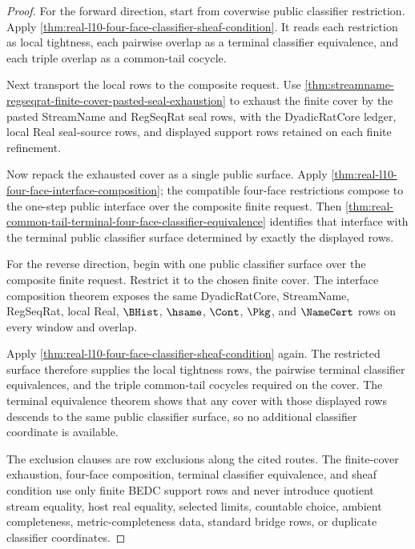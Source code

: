 \begin{proof}
For the forward direction, start from coverwise public classifier restriction. Apply \autoref{thm:real-l10-four-face-classifier-sheaf-condition}. It reads each restriction as local tightness, each pairwise overlap as a terminal classifier equivalence, and each triple overlap as a common-tail cocycle.

Next transport the local rows to the composite request. Use \autoref{thm:streamname-regseqrat-finite-cover-pasted-seal-exhaustion} to exhaust the finite cover by the pasted StreamName and RegSeqRat seal rows, with the DyadicRatCore ledger, local Real seal-source rows, and displayed support rows retained on each finite refinement.

Now repack the exhausted cover as a single public surface. Apply \autoref{thm:real-l10-four-face-interface-composition}; the compatible four-face restrictions compose to the one-step public interface over the composite finite request. Then \autoref{thm:real-common-tail-terminal-four-face-classifier-equivalence} identifies that interface with the terminal public classifier surface determined by exactly the displayed rows.

For the reverse direction, begin with one public classifier surface over the composite finite request. Restrict it to the chosen finite cover. The interface composition theorem exposes the same DyadicRatCore, StreamName, RegSeqRat, local Real, $\BHist$, $\hsame$, $\Cont$, $\Pkg$, and $\NameCert$ rows on every window and overlap.

Apply \autoref{thm:real-l10-four-face-classifier-sheaf-condition} again. The restricted surface therefore supplies the local tightness rows, the pairwise terminal classifier equivalences, and the triple common-tail cocycles required on the cover. The terminal equivalence theorem shows that any cover with those displayed rows descends to the same public classifier surface, so no additional classifier coordinate is available.

The exclusion clauses are row exclusions along the cited routes. The finite-cover exhaustion, four-face composition, terminal classifier equivalence, and sheaf condition use only finite BEDC support rows and never introduce quotient stream equality, host real equality, selected limits, countable choice, ambient completeness, metric-completeness data, standard bridge rows, or duplicate classifier coordinates.
\end{proof}

